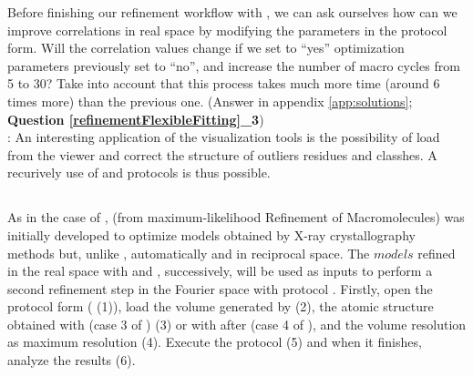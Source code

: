   Before finishing our refinement workflow with , we can ask ourselves how can we improve correlations in real space by modifying the  parameters in the protocol form. Will the correlation values change if we set to ``yes'' optimization parameters previously set to ``no'', and increase the number of macro cycles from 5 to 30? Take into account that this process takes much more time (around 6 times more) than the previous one. (Answer in appendix \ref{app:solutions}; \textbf{Question \ref{refinementFlexibleFitting}\_3})\\
  
  : An interesting application of the \phenix {} visualization tools is the possibility of load \coot from the \phenix viewer and correct the structure of outliers residues and classhes. A recurively use of \phenix {} and \coot protocols is thus possible.
  
  \subsection*{  }
  
  As in the case of \coot,  (from maximum-likelihood Refinement of Macromolecules) was initially developed to optimize models obtained by X-ray crystallography methods but, unlike \coot, automatically and in reciprocal space. The $models$ refined in the real space with \coot and \phenix {}, successively, will be used as inputs to perform a second refinement step in the Fourier space with  protocol . Firstly, open the  protocol form ( (1)), load the volume generated by \coot (2), the atomic structure obtained with \coot (case 3 of ) (3) or with \phenix {} after \coot (case 4 of ), and the volume resolution as maximum resolution (4). Execute the protocol (5) and when it finishes, analyze the results (6).
  
